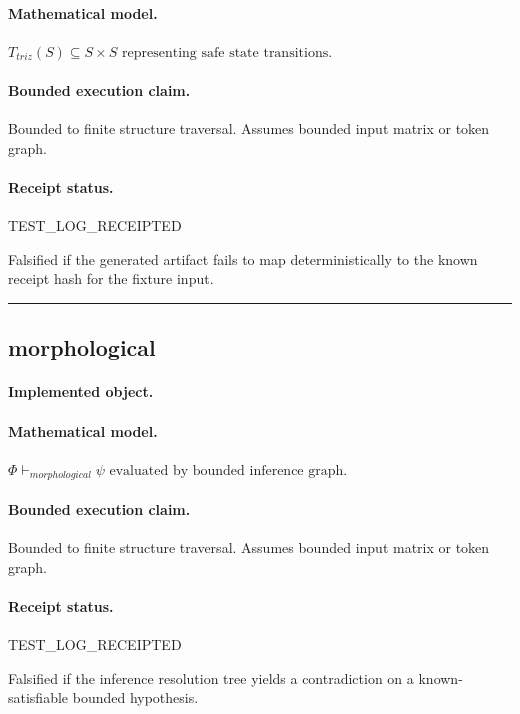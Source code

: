 \paragraph{Mathematical model.} $T_{triz}(S) \subseteq S \times S \text{ representing safe state transitions}.$
\paragraph{Bounded execution claim.} Bounded to finite structure traversal. Assumes bounded input matrix or token graph.
\paragraph{Receipt status.} TEST\_LOG\_RECEIPTED
\begin{falsifier}
Falsified if the generated artifact fails to map deterministically to the known receipt hash for the fixture input.
\end{falsifier}

\vspace{1em}\hrule\vspace{1em}
\subsection{morphological}
\paragraph{Implemented object.} 
\paragraph{Mathematical model.} $\Phi \vdash_{morphological} \psi \text{ evaluated by bounded inference graph}.$
\paragraph{Bounded execution claim.} Bounded to finite structure traversal. Assumes bounded input matrix or token graph.
\paragraph{Receipt status.} TEST\_LOG\_RECEIPTED
\begin{falsifier}
Falsified if the inference resolution tree yields a contradiction on a known-satisfiable bounded hypothesis.
\end{falsifier}

